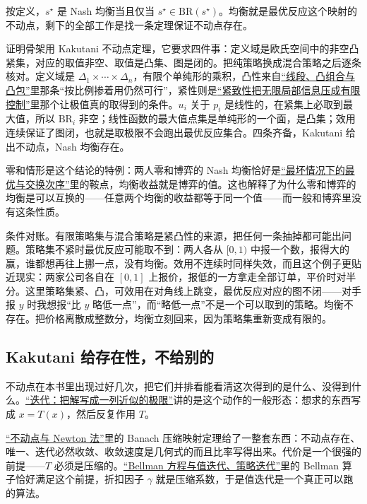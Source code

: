 按定义，\(s^\star\) 是 Nash 均衡当且仅当 \(s^\star\in\mathrm{BR}(s^\star)\)。均衡就是最优反应这个映射的不动点，剩下的全部工作是找一条定理保证不动点存在。

证明骨架用 Kakutani 不动点定理，它要求四件事：定义域是欧氏空间中的非空凸紧集，对应的取值非空、取值是凸集、图是闭的。把纯策略换成混合策略之后逐条核对。定义域是 \(\Delta_1\times\cdots\times\Delta_n\)，有限个单纯形的乘积，凸性来自\hyperref[sec:09-Convex-Optimization/02-Convex-Sets/01]{``线段、凸组合与凸包''}里那条``按比例掺着用仍然可行''，紧性则是\hyperref[sec:12-Real-Analysis-Support/03-Topology-Basics/02]{``紧致性把无限局部信息压成有限控制''}里那个让极值真的取得到的条件。\(u_i\) 关于 \(p_i\) 是线性的，在紧集上必取到最大值，所以 \(\mathrm{BR}_i\) 非空；线性函数的最大值点集是单纯形的一个面，是凸集；效用连续保证了图闭，也就是取极限不会跑出最优反应集合。四条齐备，Kakutani 给出不动点，Nash 均衡存在。

零和情形是这个结论的特例：两人零和博弈的 Nash 均衡恰好是\hyperref[sec:17-Constrained-Guarantees/06-Games-and-Equilibria/01]{``最坏情况下的最优与交换次序''}里的鞍点，均衡收益就是博弈的值。这也解释了为什么零和博弈的均衡是可以互换的——任意两个均衡的收益都等于同一个值——而一般和博弈里没有这条性质。

条件对账。有限策略集与混合策略是紧凸性的来源，把任何一条抽掉都可能出问题。策略集不紧时最优反应可能取不到：两人各从 \([0,1)\) 中报一个数，报得大的赢，谁都想再往上挪一点，没有均衡。效用不连续时同样失效，而且这个例子更贴近现实：两家公司各自在 \([0,1]\) 上报价，报低的一方拿走全部订单，平价时对半分。这里策略集紧、凸，可效用在对角线上跳变，最优反应对应的图不闭——对手报 \(y\) 时我想报``比 \(y\) 略低一点''，而``略低一点''不是一个可以取到的策略。均衡不存在。把价格离散成整数分，均衡立刻回来，因为策略集重新变成有限的。

\subsection{Kakutani 给存在性，不给别的}

不动点在本书里出现过好几次，把它们并排看能看清这次得到的是什么、没得到什么。\hyperref[sec:18-Synthesis/02-Recurring-Ideas/03]{``迭代：把解写成一列近似的极限''}讲的是这个动作的一般形态：想求的东西写成 \(x=T(x)\)，然后反复作用 \(T\)。

\hyperref[sec:08-Numerical-Analysis/02-Root-Finding/02]{``不动点与 Newton 法''}里的 Banach 压缩映射定理给了一整套东西：不动点存在、唯一、迭代必然收敛、收敛速度是几何式的而且比率写得出来。代价是一个很强的前提——\(T\) 必须是压缩的。\hyperref[sec:16-Control-and-Reinforcement-Learning/02-Reinforcement-Learning/02]{``Bellman 方程与值迭代、策略迭代''}里的 Bellman 算子恰好满足这个前提，折扣因子 \(\gamma\) 就是压缩系数，于是值迭代是一个真正可以跑的算法。

